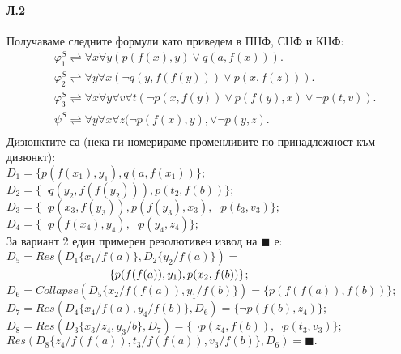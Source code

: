 \documentclass[12pt]{article}
\begin{document}
\paragraph{\hspace{0.5em} Л.2}
\begin{addmargin}[1em]{2em}
Получаваме следните формули като приведем в ПНФ, СНФ и КНФ: \\
\begin{align*}
    &\varphi_1^S \rightleftharpoons \forall x \forall y (p(f(x),y)\lor q(a,f(x))).  \\
    &\varphi_2^S \rightleftharpoons \forall y \forall x(\neg q(y,f(f(y)))\lor p(x,f(z))).  \\
    &\varphi_3^S \rightleftharpoons \forall x \forall y \forall v \forall t(\neg p(x,f(y))\lor p(f(y),x) \lor \neg p(t, v) ).  \\
    &\psi^S \rightleftharpoons \forall y \forall x \forall z (\neg p(f(x), y), \lor \neg p(y,z). \\
\end{align*}
Дизюнктите са (нека ги номерираме променливите по принадлежност към дизюнкт): \\
$D_1 = \{ p(f(x_1),y_1),q(a, f(x_1))\};$ \\
$D_2 = \{\neg q(y_2, f(f(y_2))), p(t_2, f(b))\};$ \\
$D_3 = \{ \neg p(x_3, f(y_3)), p(f(y_3), x_3), \neg p(t_3, v_3)\};$ \\
$D_4 = \{ \neg p(f(x_4),y_4), \neg p(y_4, z_4)\};$ \\
\vskip 0.1in
За вариант 2 един примерен резолютивен извод на $ \blacksquare $ е: \\
$ D_5 = Res(D_1\{x_1/f(a)\}, D_2\{y_2/f(a)\}) = $\\$ \indent \indent \indent \indent \indent \indent \{ p(f(f(a)), y_1), p(x_2, f(b)) \}$; \\
$ D_6 = Collapse(D_5\{x_2/f(f(a)), y_1/f(b)\}) = \{p(f(f(a)),f(b))\}$; \\
$ D_7 = Res(D_4\{x_4/f(a), y_4/f(b)\}, D_6) =  \{ \neg p(f(b), z_4)\}$;\\
$ D_8 = Res(D_3\{x_3/z_4, y_3/b\}, D_7) = \{\neg p(z_4, f(b)), \neg p(t_3, v_3)\}$;\\
$ Res(D_8\{z_4/f(f(a)), t_3/f(f(a)), v_3/f(b)\}, D_6) = \blacksquare. $ \\
\end{addmargin}
\end{document}
